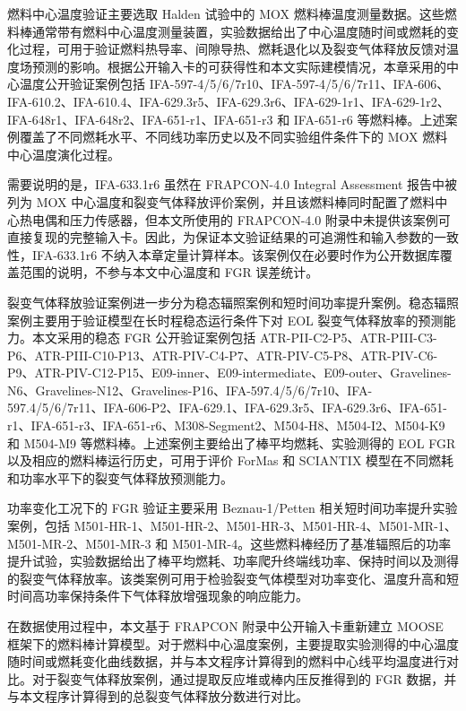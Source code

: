 燃料中心温度验证主要选取 Halden 试验中的 MOX 燃料棒温度测量数据。这些燃料棒通常带有燃料中心温度测量装置，实验数据给出了中心温度随时间或燃耗的变化过程，可用于验证燃料热导率、间隙导热、燃耗退化以及裂变气体释放反馈对温度场预测的影响。根据公开输入卡的可获得性和本文实际建模情况，本章采用的中心温度公开验证案例包括 IFA-597-4/5/6/7r10、IFA-597-4/5/6/7r11、IFA-606、IFA-610.2、IFA-610.4、IFA-629.3r5、IFA-629.3r6、IFA-629-1r1、IFA-629-1r2、IFA-648r1、IFA-648r2、IFA-651-r1、IFA-651-r3 和 IFA-651-r6 等燃料棒。上述案例覆盖了不同燃耗水平、不同线功率历史以及不同实验组件条件下的 MOX 燃料中心温度演化过程。

需要说明的是，IFA-633.1r6 虽然在 FRAPCON-4.0 Integral Assessment 报告中被列为 MOX 中心温度和裂变气体释放评价案例，并且该燃料棒同时配置了燃料中心热电偶和压力传感器，但本文所使用的 FRAPCON-4.0 附录中未提供该案例可直接复现的完整输入卡。因此，为保证本文验证结果的可追溯性和输入参数的一致性，IFA-633.1r6 不纳入本章定量计算样本。该案例仅在必要时作为公开数据库覆盖范围的说明，不参与本文中心温度和 FGR 误差统计。

裂变气体释放验证案例进一步分为稳态辐照案例和短时间功率提升案例。稳态辐照案例主要用于验证模型在长时程稳态运行条件下对 EOL 裂变气体释放率的预测能力。本文采用的稳态 FGR 公开验证案例包括 ATR-PII-C2-P5、ATR-PIII-C3-P6、ATR-PIII-C10-P13、ATR-PIV-C4-P7、ATR-PIV-C5-P8、ATR-PIV-C6-P9、ATR-PIV-C12-P15、E09-inner、E09-intermediate、E09-outer、Gravelines-N6、Gravelines-N12、Gravelines-P16、IFA-597.4/5/6/7r10、IFA-597.4/5/6/7r11、IFA-606-P2、IFA-629.1、IFA-629.3r5、IFA-629.3r6、IFA-651-r1、IFA-651-r3、IFA-651-r6、M308-Segment2、M504-H8、M504-I2、M504-K9 和 M504-M9 等燃料棒。上述案例主要给出了棒平均燃耗、实验测得的 EOL FGR 以及相应的燃料棒运行历史，可用于评价 ForMas 和 SCIANTIX 模型在不同燃耗和功率水平下的裂变气体释放预测能力。

功率变化工况下的 FGR 验证主要采用 Beznau-1/Petten 相关短时间功率提升实验案例，包括 M501-HR-1、M501-HR-2、M501-HR-3、M501-HR-4、M501-MR-1、M501-MR-2、M501-MR-3 和 M501-MR-4。这些燃料棒经历了基准辐照后的功率提升试验，实验数据给出了棒平均燃耗、功率爬升终端线功率、保持时间以及测得的裂变气体释放率。该类案例可用于检验裂变气体模型对功率变化、温度升高和短时间高功率保持条件下气体释放增强现象的响应能力。

在数据使用过程中，本文基于 FRAPCON 附录中公开输入卡重新建立 MOOSE 框架下的燃料棒计算模型。对于燃料中心温度案例，主要提取实验测得的中心温度随时间或燃耗变化曲线数据，并与本文程序计算得到的燃料中心线平均温度进行对比。对于裂变气体释放案例，通过提取反应堆或棒内压反推得到的 FGR 数据，并与本文程序计算得到的总裂变气体释放分数进行对比。

